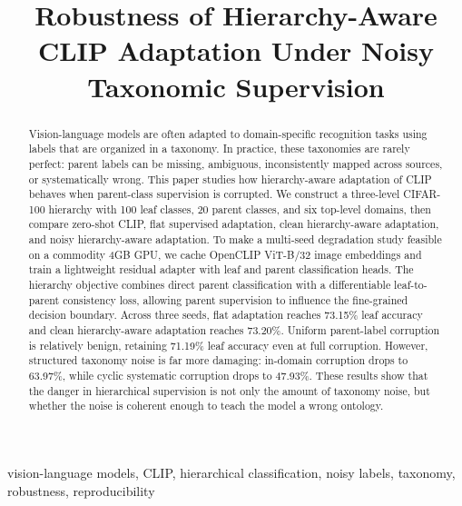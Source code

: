 \documentclass[conference]{IEEEtran}
\begin{document}
\title{Robustness of Hierarchy-Aware CLIP Adaptation Under Noisy Taxonomic Supervision}

\author{
}

\maketitle

\begin{abstract}
Vision-language models are often adapted to domain-specific recognition tasks
using labels that are organized in a taxonomy. In practice, these taxonomies
are rarely perfect: parent labels can be missing, ambiguous, inconsistently
mapped across sources, or systematically wrong. This paper studies how
hierarchy-aware adaptation of CLIP behaves when parent-class supervision is
corrupted. We construct a three-level CIFAR-100 hierarchy with 100 leaf
classes, 20 parent classes, and six top-level domains, then compare zero-shot
CLIP, flat supervised adaptation, clean hierarchy-aware adaptation, and noisy
hierarchy-aware adaptation. To make a multi-seed degradation study feasible on
a commodity 4GB GPU, we cache OpenCLIP ViT-B/32 image embeddings and train a
lightweight residual adapter with leaf and parent classification heads. The
hierarchy objective combines direct parent classification with a differentiable
leaf-to-parent consistency loss, allowing parent supervision to influence the
fine-grained decision boundary. Across three seeds, flat adaptation reaches
73.15\% leaf accuracy and clean hierarchy-aware adaptation reaches 73.20\%.
Uniform parent-label corruption is relatively benign, retaining 71.19\% leaf
accuracy even at full corruption. However, structured taxonomy noise is far
more damaging: in-domain corruption drops to 63.97\%, while cyclic systematic
corruption drops to 47.93\%. These results show that the danger in hierarchical
supervision is not only the amount of taxonomy noise, but whether the noise is
coherent enough to teach the model a wrong ontology.
\end{abstract}

\begin{IEEEkeywords}
vision-language models, CLIP, hierarchical classification, noisy labels,
taxonomy, robustness, reproducibility
\end{IEEEkeywords}
\end{document}
